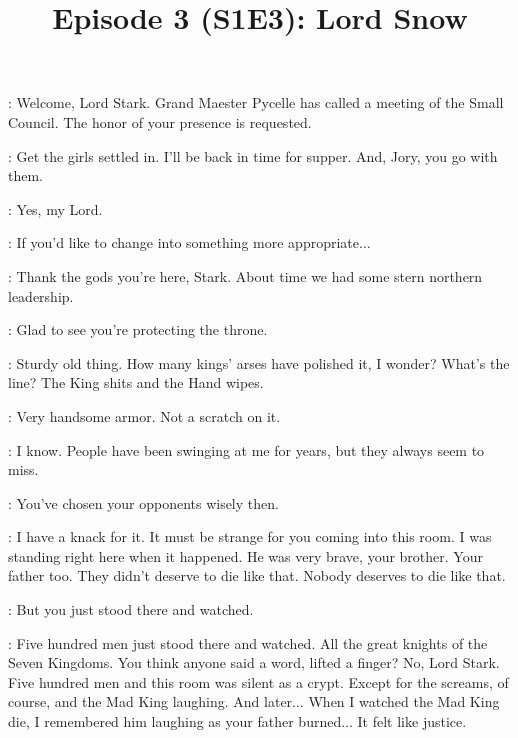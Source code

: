 

\title{Episode 3 (S1E3): Lord Snow}
\author{}
\date{}
\maketitle



\scene



\PAGE: Welcome, Lord Stark. Grand Maester Pycelle has called a meeting of the Small Council. The honor of your presence is requested. 

\NED: Get the girls settled in. I'll be back in time for supper. And, Jory, you go with them. 

\JORY: Yes, my Lord. 

\PAGE: If you'd like to change into something more appropriate$\ldots$ 


\scene



\JAIME: Thank the gods you're here, Stark. About time we had some stern northern leadership. 

\NED: Glad to see you're protecting the throne. 

\JAIME: Sturdy old thing. How many kings' arses have polished it, I wonder? What's the line? The King shits and the Hand wipes. 

\NED: Very handsome armor. Not a scratch on it. 

\JAIME: I know. People have been swinging at me for years, but they always seem to miss. 

\NED: You've chosen your opponents wisely then. 

\JAIME: I have a knack for it. It must be strange for you coming into this room. I was standing right here when it happened. He was very brave, your brother. Your father too. They didn't deserve to die like that. Nobody deserves to die like that. 

\NED: But you just stood there and watched. 

\JAIME: Five hundred men just stood there and watched. All the great knights of the Seven Kingdoms. You think anyone said a word, lifted a finger? No, Lord Stark. Five hundred men and this room was silent as a crypt. Except for the screams, of course, and the Mad King laughing. And later$\ldots$ When I watched the Mad King die, I remembered him laughing as your father burned$\ldots$ It felt like justice. 


